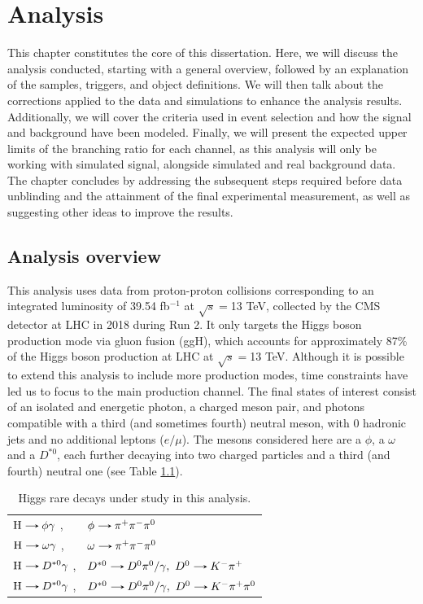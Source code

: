 \chapter[Analysis]{Analysis}\label{chap:analysis}

This chapter constitutes the core of this dissertation. Here, we will discuss the analysis conducted, starting with a general overview, followed by an explanation of the samples, triggers, and object definitions. We will then talk about the corrections applied to the data and simulations to enhance the analysis results. Additionally, we will cover the criteria used in event selection and how the signal and background have been modeled. Finally, we will present the expected upper limits of the branching ratio for each channel, as this analysis will only be working with simulated signal, alongside simulated and real background data. The chapter concludes by addressing the subsequent steps required before data unblinding and the attainment of the final experimental measurement, as well as suggesting other ideas to improve the results.

\section{Analysis overview}\label{sec:analysis_overview}

This analysis uses data from proton-proton collisions corresponding to an integrated luminosity of 39.54 fb$^{-1}$ at $\sqrt{s}=$13 TeV, collected by the CMS detector at LHC in 2018 during Run 2. It only targets the Higgs boson production mode via gluon fusion (ggH), which accounts for approximately 87\% of the Higgs boson production at LHC at $\sqrt{s}=$13 TeV. Although it is possible to extend this analysis to include more production modes, time constraints have led us to focus to the main production channel. The final states of interest consist of an isolated and energetic photon, a charged meson pair, and photons compatible with a third (and sometimes fourth) neutral meson, with 0 hadronic jets and no additional leptons ($e/\mu$). The mesons considered here are a $\phi$, a $\omega$ and a $D^{*0}$, each further decaying into two charged particles and a third (and fourth) neutral one (see Table \ref{tab:Higgs_rare_decays_three}).

\begin{table}[ht]
    \centering
    \begin{tabular}{ll}
        $\text{H}\decaysto \phi\gamma$ ,& $\phi\decaysto \pi^+\pi^-\pi^0$ \\
        $\text{H}\decaysto \omega\gamma$ ,& $\omega\decaysto \pi^+\pi^-\pi^0$\\
        $\text{H}\decaysto D^{*0}\gamma$ ,& $D^{*0}\decaysto D^{0}\pi^{0}/\gamma,\ D^{0}\decaysto K^{-}\pi^{+}$\\
        $\text{H}\decaysto D^{*0}\gamma$ ,& $D^{*0}\decaysto D^{0}\pi^{0}/\gamma,\ D^{0}\decaysto K^{-}\pi^{+}\pi^{0}$
    \end{tabular}
    \caption{Higgs rare decays under study in this analysis.}
    \label{tab:Higgs_rare_decays_three}
\end{table}

